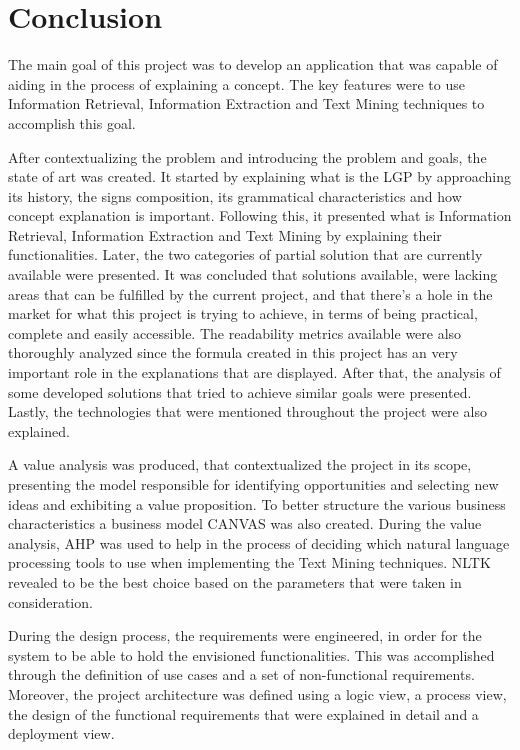 
\chapter{Conclusion} %
\label{chap:Chapter7}

The main goal of this project was to develop an application that was capable of aiding in the process of explaining a concept.
The key features were to use Information Retrieval, Information Extraction and Text Mining techniques to accomplish this goal.

After contextualizing the problem and introducing the problem and goals, the state of art was created.
It started by explaining what is the \gls{LGP} by approaching its history, the signs composition, its grammatical characteristics and how concept explanation is important.
Following this, it presented what is Information Retrieval, Information Extraction and Text Mining by explaining their functionalities.
Later, the two categories of partial solution that are currently available were presented.
It was concluded that solutions available, were lacking areas that can be fulfilled by the current project, and that there's a hole in the market for what this project is trying to achieve, in terms of being practical, complete and easily accessible.
The readability metrics available were also thoroughly analyzed since the formula created in this project has an very important role in the explanations that are displayed.
After that, the analysis of some developed solutions that tried to achieve similar goals were presented.
Lastly, the technologies that were mentioned throughout the project were also explained.

A value analysis was produced, that contextualized the project in its scope, presenting the model responsible for identifying opportunities and selecting new ideas and exhibiting a value proposition.
To better structure the various business characteristics a business model CANVAS was also created.
During the value analysis, \gls{AHP} was used to help in the process of deciding which natural language processing tools to use when implementing the Text Mining techniques.
NLTK revealed to be the best choice based on the parameters that were taken in consideration.

During the design process, the requirements were engineered, in order for the system to be able to hold the envisioned functionalities.
This was accomplished through the definition of use cases and a set of non-functional requirements.
Moreover, the project architecture was defined using a logic view, a process view, the design of the functional requirements that were explained in detail and a deployment view.

